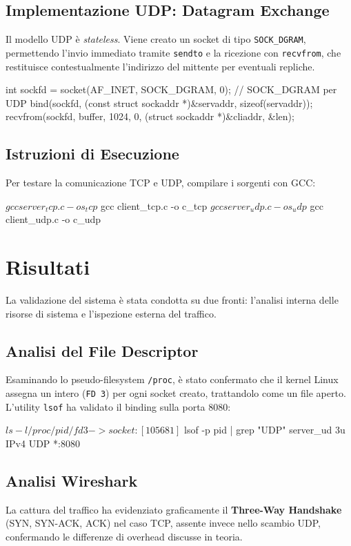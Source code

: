 \documentclass[a4paper,12pt]{article}
\begin{document}
\subsection{Implementazione UDP: Datagram Exchange}
Il modello UDP è \textit{stateless}. Viene creato un socket di tipo \texttt{SOCK\_DGRAM}, permettendo l'invio immediato tramite \texttt{sendto} e la ricezione con \texttt{recvfrom}, che restituisce contestualmente l'indirizzo del mittente per eventuali repliche.
\begin{ccode}
int sockfd = socket(AF_INET, SOCK_DGRAM, 0); // SOCK_DGRAM per UDP
bind(sockfd, (const struct sockaddr *)&servaddr, sizeof(servaddr));
recvfrom(sockfd, buffer, 1024, 0, (struct sockaddr *)&cliaddr, &len);
\end{ccode}


\subsection{Istruzioni di Esecuzione}
Per testare la comunicazione TCP e UDP, compilare i sorgenti con GCC:
\begin{terminal}[Build]
$ gcc server_tcp.c -o s_tcp
$ gcc client_tcp.c -o c_tcp
$ gcc server_udp.c -o s_udp
$ gcc client_udp.c -o c_udp
\end{terminal}

\section{Risultati}
La validazione del sistema è stata condotta su due fronti: l'analisi interna delle risorse di sistema e l'ispezione esterna del traffico.

\subsection{Analisi del File Descriptor}
Esaminando lo pseudo-filesystem \texttt{/proc}, è stato confermato che il kernel Linux assegna un intero (\texttt{FD 3}) per ogni socket creato, trattandolo come un file aperto. L'utility \texttt{lsof} ha validato il binding sulla porta 8080:
\begin{terminal}[Ispezione FD]
$ ls -l /proc/pid/fd
3 -> socket:[105681]
$ lsof -p pid | grep "UDP"
server_ud  3u  IPv4  UDP *:8080 
\end{terminal}

\subsection{Analisi Wireshark}
La cattura del traffico ha evidenziato graficamente il \textbf{Three-Way Handshake} (SYN, SYN-ACK, ACK) nel caso TCP, assente invece nello scambio UDP, confermando le differenze di overhead discusse in teoria.
\end{document}
